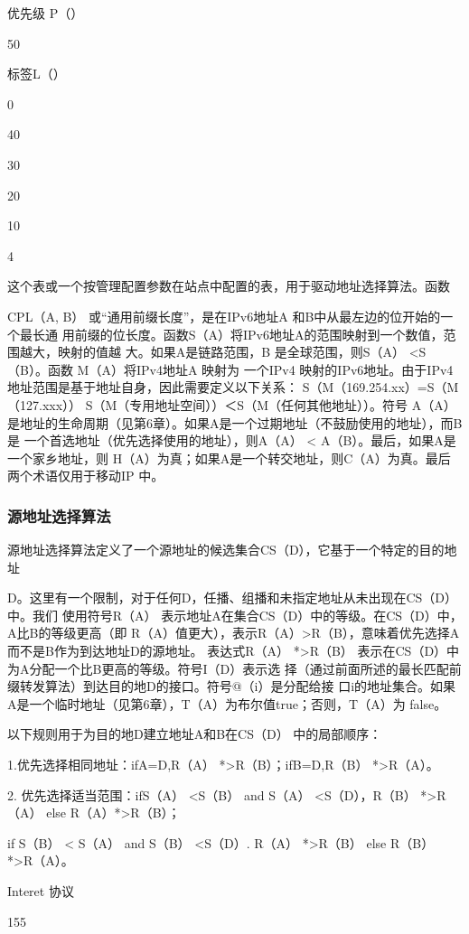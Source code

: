 优先级 P（）

50

标签L（）

0

40

30

20

10

4

这个表或一个按管理配置参数在站点中配置的表，用于驱动地址选择算法。函数

CPL（A, B） 或“通用前缀长度”，是在IPv6地址A 和B中从最左边的位开始的一个最长通
用前缀的位长度。函数S（A）将IPv6地址A的范围映射到一个数值，范围越大，映射的值越
大。如果A是链路范围，B 是全球范围，则S（A） <S（B）。函数 M（A）将IPv4地址A 映射为
一个IPv4 映射的IPv6地址。由于IPv4地址范围是基于地址自身，因此需要定义以下关系：
S（M（169.254.xx）=S（M（127.xxx）） S（M（专用地址空间））＜S（M（任何其他地址））。符号
A（A）是地址的生命周期（见第6章）。如果A是一个过期地址（不鼓励使用的地址），而B是
一个首选地址（优先选择使用的地址），则A（A） < A（B）。最后，如果A是一个家乡地址，则
H（A）为真；如果A是一个转交地址，则C（A）为真。最后两个术语仅用于移动IP 中。

\subsubsection{源地址选择算法}
源地址选择算法定义了一个源地址的候选集合CS（D），它基于一个特定的目的地址

D。这里有一个限制，对于任何D，任播、组播和未指定地址从未出现在CS（D）中。我们
使用符号R（A） 表示地址A在集合CS（D）中的等级。在CS（D）中，A比B的等级更高（即
R（A）值更大），表示R（A）>R（B），意味着优先选择A 而不是B作为到达地址D的源地址。
表达式R（A） *>R（B） 表示在CS（D）中为A分配一个比B更高的等级。符号I（D）表示选
择（通过前面所述的最长匹配前缀转发算法）到达目的地D的接口。符号@（i）是分配给接
口i的地址集合。如果A是一个临时地址（见第6章），T（A）为布尔值true；否则，T（A）为
false。

以下规则用于为目的地D建立地址A和B在CS（D） 中的局部顺序：

1.优先选择相同地址：ifA=D,R（A） *>R（B）；ifB=D,R（B） *>R（A）。

2. 优先选择适当范围：ifS（A） <S（B） and S（A） <S（D），R（B） *>R（A） else R（A）*>R（B）；

if S（B） < S（A） and S（B） <S（D）. R（A） *>R（B） else R（B） *>R（A）。

Interet 协议

155

